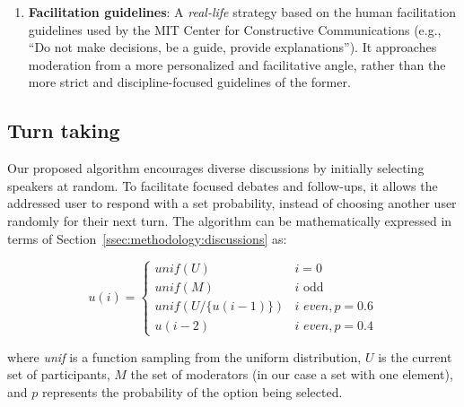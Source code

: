 \begin{enumerate}[noitemsep]
    \item \textbf{Facilitation guidelines}: A \emph{real-life} strategy based on the human facilitation guidelines used by the MIT Center for Constructive Communications \cite{dimitra-book} (e.g., “Do not make decisions, be a guide, provide explanations”). It approaches moderation from a more personalized and facilitative angle, rather than the more strict and discipline-focused guidelines of the former.
\end{enumerate}


\subsection{Turn taking}
\label{ssec:experimental:turn}

Our proposed algorithm encourages diverse discussions by initially selecting speakers at random. To facilitate focused debates and follow-ups, it allows the addressed user to respond with a set probability, instead of choosing another user randomly for their next turn. The algorithm can be mathematically expressed in terms of Section~\ref{ssec:methodology:discussions} as:

\small
\begin{equation}
\label{eq:turn_taking}
    u(i) = \left\{
\begin{array}{ll}
\textit{unif}(U) & i=0\\
    \textit{unif}(M) & i \text{ odd}\\
    \textit{unif}(U/\{u(i-1)\}) & i \textit{ even}, p=0.6 \\
    u(i-2) & i \textit{ even}, p=0.4 
\end{array} 
\right.
\end{equation}
\normalsize

\noindent where \textit{unif} is a function sampling from the uniform distribution, $U$ is the current set of participants, $M$ the set of moderators (in our case a set with one element), and $p$ represents the probability of the option being selected.

